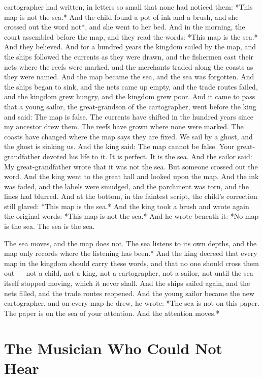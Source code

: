 \documentclass[12pt,openany]{book}
\begin{document}
cartographer had written, in letters so small that none had noticed them: *This map is not the sea.* And the child found a pot of ink and a brush, and she crossed out the word not*, and she went to her bed. And in the morning, the court assembled before the map, and they read the words: *This map is the sea.* And they believed. And for a hundred years the kingdom sailed by the map, and the ships followed the currents as they were drawn, and the fishermen cast their nets where the reefs were marked, and the merchants traded along the coasts as they were named. And the map became the sea, and the sea was forgotten. And the ships began to sink, and the nets came up empty, and the trade routes failed, and the kingdom grew hungry, and the kingdom grew poor. And it came to pass that a young sailor, the great-grandson of the cartographer, went before the king and said: The map is false. The currents have shifted in the hundred years since my ancestor drew them. The reefs have grown where none were marked. The coasts have changed where the map says they are fixed. We sail by a ghost, and the ghost is sinking us. And the king said: The map cannot be false. Your great-grandfather devoted his life to it. It is perfect. It is the sea. And the sailor said: My great-grandfather wrote that it was not the sea. But someone crossed out the word. And the king went to the great hall and looked upon the map. And the ink was faded, and the labels were smudged, and the parchment was torn, and the lines had blurred. And at the bottom, in the faintest script, the child's correction still glared: *This map is the sea.* And the king took a brush and wrote again the original words: *This map is not the sea.* And he wrote beneath it: *No map is the sea. The sea is the sea.


The sea moves, and the map does not. The sea listens to its own depths, and the map only records where the listening has been.* And the king decreed that every map in the kingdom should carry these words, and that no one should cross them out --- not a child, not a king, not a cartographer, not a sailor, not until the sea itself stopped moving, which it never shall. And the ships sailed again, and the nets filled, and the trade routes reopened. And the young sailor became the new cartographer, and on every map he drew, he wrote: *The sea is not on this paper. The paper is on the sea of your attention. And the attention moves.*


\chapter{The Musician Who Could Not Hear}
\end{document}
